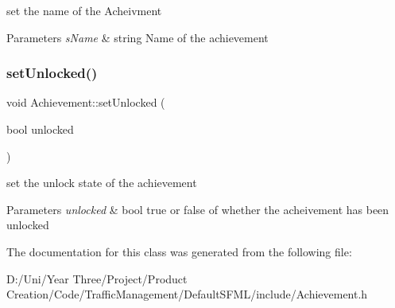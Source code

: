 set the name of the Acheivment 


\begin{DoxyParams}{Parameters}
{\em s\+Name} & string Name of the achievement \\
\hline
\end{DoxyParams}
\hypertarget{class_achievement_a59aa51eab50fed4fb72eee2ff733e3ac}{}\label{class_achievement_a59aa51eab50fed4fb72eee2ff733e3ac} 
\subsubsection{\texorpdfstring{set\+Unlocked()}{setUnlocked()}}
{\footnotesize\ttfamily void Achievement\+::set\+Unlocked (\begin{DoxyParamCaption}\item[{bool}]{unlocked }\end{DoxyParamCaption})}



set the unlock state of the achievement 


\begin{DoxyParams}{Parameters}
{\em unlocked} & bool true or false of whether the acheivement has been unlocked \\
\hline
\end{DoxyParams}


The documentation for this class was generated from the following file\+:\begin{DoxyCompactItemize}
\item 
D\+:/\+Uni/\+Year Three/\+Project/\+Product Creation/\+Code/\+Traffic\+Management/\+Default\+S\+F\+M\+L/include/Achievement.\+h\end{DoxyCompactItemize}
